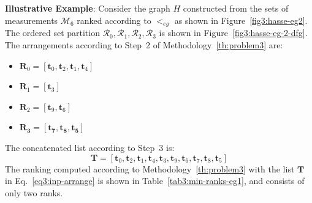 \documentclass[acmsmall,screen, review]{acmart}
\begin{document}
\textbf{Illustrative Example}:  Consider the graph $H$ constructed from the sets of measurements $\mathcal{M}_6$ ranked according to $<_{eg}$  as shown in Figure~\ref{fig3:hasse-eg2}. The ordered set partition $\mathcal{R}_0, \mathcal{R}_1, \mathcal{R}_2, \mathcal{R}_3$ is shown in Figure~\ref{fig3:hasse-eg-2-dfg}. The arrangements according to Step~2 of Methodology~\ref{th:problem3} are:
\begin{itemize}
	\setlength{\itemsep}{0pt} 
	\item $\mathbf{R}_0 = [\mathbf{t}_0, \mathbf{t}_2, \mathbf{t}_1, \mathbf{t}_4]$
	\item $\mathbf{R}_1 = [\mathbf{t}_3]$
	\item $\mathbf{R}_2 = [\mathbf{t}_9, \mathbf{t}_6]$
	\item $\mathbf{R_3 = [\mathbf{t}_7, \mathbf{t}_8, \mathbf{t}_5]}$
\end{itemize}
The concatenated list according to Step~3 is:
\begin{equation}
\label{eq3:inp-arrange}
\mathbf{T} = [\mathbf{t}_0, \mathbf{t}_2, \mathbf{t}_1, \mathbf{t}_4, \mathbf{t}_3, \mathbf{t}_9, \mathbf{t}_6, \mathbf{t}_7, \mathbf{t}_8, \mathbf{t}_5]
\end{equation}
The ranking computed according to Methodology~\ref{th:problem3} with the list $\mathbf{T}$ in Eq.~\ref{eq3:inp-arrange} is shown in Table~\ref{tab3:min-ranks-eg1}, and consists of only two ranks.
\end{document}
